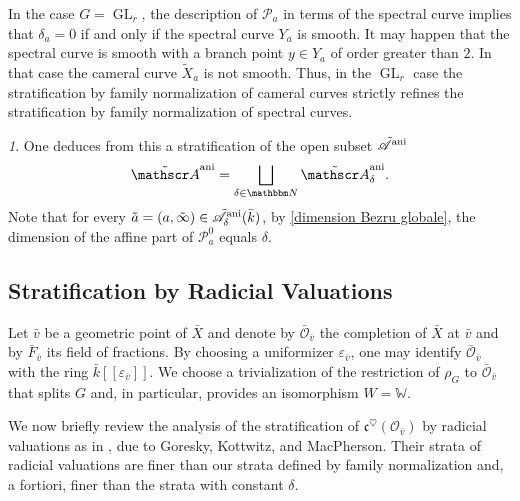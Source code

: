 \documentclass[12pt,english]{smfart}
\numberwithin{equation}{subsection}
\theoremstyle{remark}
\newtheorem{numero}[equation]{}
\newcommand\calA{{\mathscr A}}
\newcommand\calP{{\mathscr P}}
\newcommand\NN{{\mathbbm N}}
\newcommand\ani{{\rm ani}}
\begin{document}
In the case $G=\operatorname{GL}_r$, the description of $\mathcal{P}_a$ in terms of the spectral curve implies that $\delta_a=0$ if and only if the spectral curve $Y_a$ is smooth. It may happen that the spectral curve is smooth with a branch point $y\in Y_a$ of order greater than $2$. In that case the cameral curve $\widetilde X_a$ is not smooth. Thus, in the $\operatorname{GL}_r$ case the stratification by family normalization of cameral curves strictly refines the stratification by family normalization of spectral curves.

\begin{numero}\label{stratification delta ani}
One deduces from this a stratification of the open subset $\tilde\calA^\ani$
$$\tilde\calA^\ani=\bigsqcup_{\delta\in\NN}\tilde\calA^\ani_\delta.$$
Note that for every $\tilde a=(a,\tilde\infty)\in\tilde\calA^\ani_\delta(\bar k)$, by \ref{dimension Bezru globale}, the dimension of the affine part of $\calP^0_a$ equals $\delta$.
\end{numero}

\subsection{Stratification by Radicial Valuations}
\label{subsection : valuations radicielles}

Let $\bar{v}$ be a geometric point of $\bar X$ and denote by $\bar{\mathcal{O}}_{\bar{v}}$ the completion of $\bar X$ at $\bar{v}$ and by $\bar F_{\bar{v}}$ its field of fractions. By choosing a uniformizer $\varepsilon_{\bar{v}}$, one may identify $\bar{\mathcal{O}}_{\bar{v}}$ with the ring $\bar k[[\varepsilon_{\bar{v}}]]$. We choose a trivialization of the restriction of $\rho_G$ to $\bar{\mathcal{O}}_{\bar{v}}$ that splits $G$ and, in particular, provides an isomorphism $W=\mathbb{W}$.

We now briefly review the analysis of the stratification of $\mathfrak{c}^\heartsuit(\mathcal{O}_{\bar{v}})$ by radicial valuations as in \cite{GKM-codim}, due to Goresky, Kottwitz, and MacPherson. Their strata of radicial valuations are finer than our strata defined by family normalization and, a fortiori, finer than the strata with constant $\delta$.
\end{document}
